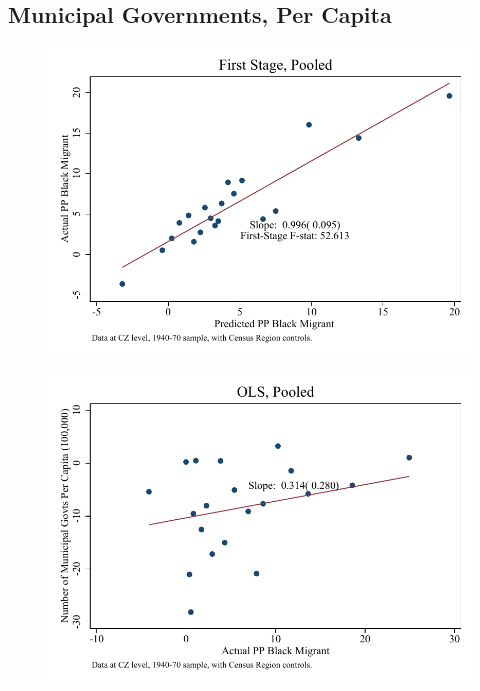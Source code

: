 \documentclass{article}
\begin{document}
\subsection{Municipal Governments, Per Capita}

\clearpage
\begin{figure}
\centering
\includegraphics{figures/simplefigs/pooled_gen_muni_pc_C3_fs.pdf}
\end{figure}
\clearpage
\begin{figure}
\centering
\includegraphics{figures/simplefigs/pooled_gen_muni_pc_C3_ols.pdf}
\end{figure}
\clearpage
\end{document}
